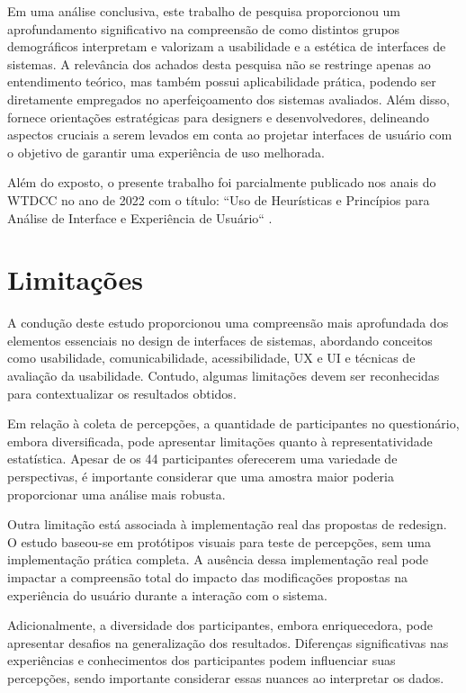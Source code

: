Em uma análise conclusiva, este trabalho de pesquisa proporcionou um aprofundamento significativo na compreensão de como distintos grupos demográficos interpretam e valorizam a usabilidade e a estética de interfaces de sistemas. A relevância dos achados desta pesquisa não se restringe apenas ao entendimento teórico, mas também possui aplicabilidade prática, podendo ser diretamente empregados no aperfeiçoamento dos sistemas avaliados. Além disso, fornece orientações estratégicas para designers e desenvolvedores, delineando aspectos cruciais a serem levados em conta ao projetar interfaces de usuário com o objetivo de garantir uma experiência de uso melhorada.

Além do exposto, o presente trabalho foi parcialmente publicado nos anais do \ac{WTDCC} no ano de 2022 com o título: “Uso de Heurísticas e Princípios para Análise de Interface e Experiência de Usuário“ \cite{Zanetti2022}.

\section{Limitações}

A condução deste estudo proporcionou uma compreensão mais aprofundada dos elementos essenciais no design de interfaces de sistemas, abordando conceitos como usabilidade, comunicabilidade, acessibilidade, \ac{UX} e \ac{UI} e técnicas de avaliação da usabilidade. Contudo, algumas limitações devem ser reconhecidas para contextualizar os resultados obtidos.

Em relação à coleta de percepções, a quantidade de participantes no questionário, embora diversificada, pode apresentar limitações quanto à representatividade estatística. Apesar de os 44 participantes oferecerem uma variedade de perspectivas, é importante considerar que uma amostra maior poderia proporcionar uma análise  mais robusta.

Outra limitação está associada à implementação real das propostas de redesign. O estudo baseou-se em protótipos visuais para teste de percepções, sem uma implementação prática completa. A ausência dessa implementação real pode impactar a compreensão total do impacto das modificações propostas na experiência do usuário durante a interação com o sistema.

Adicionalmente, a diversidade dos participantes, embora enriquecedora, pode apresentar desafios na generalização dos resultados. Diferenças significativas nas experiências e conhecimentos dos participantes podem influenciar suas percepções, sendo importante considerar essas nuances ao interpretar os dados.


